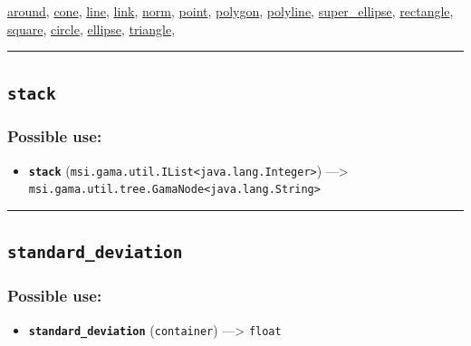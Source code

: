 \documentclass[]{book}
\providecommand{\tightlist}{%
  \setlength{\itemsep}{0pt}\setlength{\parskip}{0pt}}
\theoremstyle{definition}
\theoremstyle{definition}
\theoremstyle{definition}
\theoremstyle{remark}
\begin{document}
\href{operators-a-to-a.html\#around}{around},
\href{operators-b-to-c.html\#cone}{cone},
\href{operators-i-to-m.html\#line}{line},
\href{operators-i-to-m.html\#link}{link},
\href{operators-n-to-r.html\#norm}{norm},
\href{operators-n-to-r.html\#point}{point},
\href{operators-n-to-r.html\#polygon}{polygon},
\href{operators-n-to-r.html\#polyline}{polyline},
\href{operators-s-to-z.html\#super_ellipse}{super\_ellipse},
\href{operators-n-to-r.html\#rectangle}{rectangle},
\href{operators-s-to-z.html\#square}{square},
\href{operators-b-to-c.html\#circle}{circle},
\href{operators-d-to-h.html\#ellipse}{ellipse},
\href{operators-s-to-z.html\#triangle}{triangle},

\begin{center}\rule{0.5\linewidth}{\linethickness}\end{center}

\subsection{\texorpdfstring{\texttt{stack}}{stack}}\label{stack}

\subsubsection{Possible use:}\label{possible-use-501}

\begin{itemize}
\tightlist
\item
  \textbf{\texttt{stack}}
  (\texttt{msi.gama.util.IList\textless{}java.lang.Integer\textgreater{}})
  ---\textgreater{}
  \texttt{msi.gama.util.tree.GamaNode\textless{}java.lang.String\textgreater{}}
\end{itemize}

\begin{center}\rule{0.5\linewidth}{\linethickness}\end{center}

\subsection{\texorpdfstring{\texttt{standard\_deviation}}{standard\_deviation}}\label{standard_deviation}

\subsubsection{Possible use:}\label{possible-use-502}

\begin{itemize}
\tightlist
\item
  \textbf{\texttt{standard\_deviation}} (\texttt{container})
  ---\textgreater{} \texttt{float}
\end{itemize}
\end{document}
